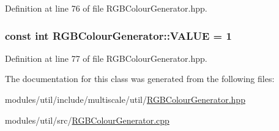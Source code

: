 Definition at line 76 of file R\-G\-B\-Colour\-Generator.\-hpp.

\hypertarget{classmultiscale_1_1RGBColourGenerator_a859abef56e015354d032c46680132850}{
\subsubsection[{V\-A\-L\-U\-E}]{\setlength{\rightskip}{0pt plus 5cm}const int R\-G\-B\-Colour\-Generator\-::\-V\-A\-L\-U\-E = 1\hspace{0.3cm}{\ttfamily [static]}}}\label{classmultiscale_1_1RGBColourGenerator_a859abef56e015354d032c46680132850}


Definition at line 77 of file R\-G\-B\-Colour\-Generator.\-hpp.



The documentation for this class was generated from the following files\-:\begin{DoxyCompactItemize}
\item 
modules/util/include/multiscale/util/\hyperlink{RGBColourGenerator_8hpp}{R\-G\-B\-Colour\-Generator.\-hpp}\item 
modules/util/src/\hyperlink{RGBColourGenerator_8cpp}{R\-G\-B\-Colour\-Generator.\-cpp}\end{DoxyCompactItemize}
